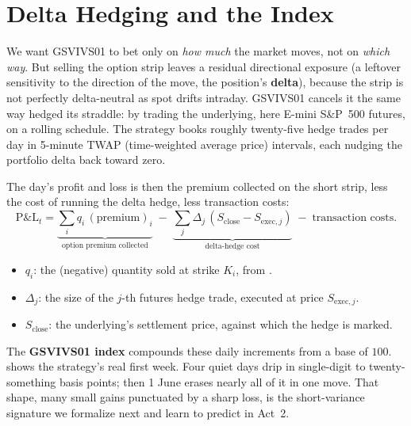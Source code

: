 \section{Delta Hedging and the Index}
\label{sec:gsvivs:hedge-index}

We want GSVIVS01 to bet only on \emph{how much} the market moves, not on \emph{which way}. But selling the option strip leaves a residual directional exposure (a leftover sensitivity to the direction of the move, the position's \textbf{delta}), because the strip is not perfectly delta-neutral as spot drifts intraday. GSVIVS01 cancels it the same way  hedged its straddle: by trading the underlying, here E-mini S\&P~500 futures, on a rolling schedule. The strategy books roughly twenty-five hedge trades per day in 5-minute TWAP (time-weighted average price) intervals, each nudging the portfolio delta back toward zero.

The day's profit and loss is then the premium collected on the short strip, less the cost of running the delta hedge, less transaction costs:
\begin{equation}
\label{eq:gsvivs:dailypnl}
\text{P\&L}_t = \underbrace{\sum_i q_i\,(\text{premium})_i}_{\text{option premium collected}} \;-\; \underbrace{\sum_j \Delta_j\,(S_{\text{close}} - S_{\text{exec},j})}_{\text{delta-hedge cost}} \;-\; \text{transaction costs}.
\end{equation}
\begin{itemize}
  \item $q_i$: the (negative) quantity sold at strike $K_i$, from .
  \item $\Delta_j$: the size of the $j$-th futures hedge trade, executed at price $S_{\text{exec},j}$.
  \item $S_{\text{close}}$: the underlying's settlement price, against which the hedge is marked.
\end{itemize}

The \textbf{GSVIVS01 index} compounds these daily increments from a base of $100$.  shows the strategy's real first week. Four quiet days drip in single-digit to twenty-something basis points; then 1 June erases nearly all of it in one move. That shape, many small gains punctuated by a sharp loss, is the short-variance signature we formalize next and learn to predict in Act~2.

